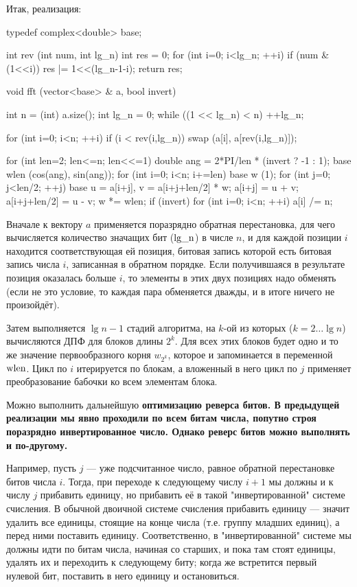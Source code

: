 Итак, реализация:

\code
typedef complex<double> base;

int rev (int num, int lg_n) {
	int res = 0;
	for (int i=0; i<lg_n; ++i)
		if (num & (1<<i))
			res |= 1<<(lg_n-1-i);
	return res;
}

void fft (vector<base> & a, bool invert) {
	int n = (int) a.size();
	int lg_n = 0;
	while ((1 << lg_n) < n)  ++lg_n;

	for (int i=0; i<n; ++i)
		if (i < rev(i,lg_n))
			swap (a[i], a[rev(i,lg_n)]);

	for (int len=2; len<=n; len<<=1) {
		double ang = 2*PI/len * (invert ? -1 : 1);
		base wlen (cos(ang), sin(ang));
		for (int i=0; i<n; i+=len) {
			base w (1);
			for (int j=0; j<len/2; ++j) {
				base u = a[i+j],  v = a[i+j+len/2] * w;
				a[i+j] = u + v;
				a[i+j+len/2] = u - v;
				w *= wlen;
			}
		}
	}
	if (invert)
		for (int i=0; i<n; ++i)
			a[i] /= n;
}

\endcode

Вначале к вектору $a$ применяется поразрядно обратная перестановка, для чего вычисляется количество значащих бит ($\rm lg\_n$) в числе $n$, и для каждой позиции $i$ находится соответствующая ей позиция, битовая запись которой есть битовая запись числа $i$, записанная в обратном порядке. Если получившаяся в результате позиция оказалась больше $i$, то элементы в этих двух позициях надо обменять (если не это условие, то каждая пара обменяется дважды, и в итоге ничего не произойдёт).

Затем выполняется $\lg n - 1$ стадий алгоритма, на $k$-ой из которых ($k=2 \ldots \lg n$) вычисляются ДПФ для блоков длины $2^k$. Для всех этих блоков будет одно и то же значение первообразного корня $w_{2^k}$, которое и запоминается в переменной $\rm wlen$. Цикл по $i$ итерируется по блокам, а вложенный в него цикл по $j$ применяет преобразование бабочки ко всем элементам блока.

Можно выполнить дальнейшую \bf{оптимизацию реверса битов}. В предыдущей реализации мы явно проходили по всем битам числа, попутно строя поразрядно инвертированное число. Однако реверс битов можно выполнять и по-другому.

Например, пусть $j$ --- уже подсчитанное число, равное обратной перестановке битов числа $i$. Тогда, при переходе к следующему числу $i+1$ мы должны и к числу $j$ прибавить единицу, но прибавить её в такой "инвертированной" системе счисления. В обычной двоичной системе счисления прибавить единицу --- значит удалить все единицы, стоящие на конце числа (т.е. группу младших единиц), а перед ними поставить единицу. Соответственно, в "инвертированной" системе мы должны идти по битам числа, начиная со старших, и пока там стоят единицы, удалять их и переходить к следующему биту; когда же встретится первый нулевой бит, поставить в него единицу и остановиться.

